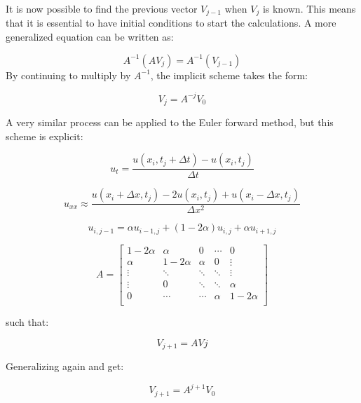 \documentclass[10pt,a4paper]{article}
\begin{document}
\noindent It is now possible to find the previous vector $V_{j-1}$ when $V_j$ is known. This means that it is essential to have initial conditions to start the calculations. A more generalized equation can be written as:

\begin{equation}
A^{-1}(AV_j) = A^{-1}(V_{j-1})
\end{equation}
\noindent By continuing to multiply by $A^{-1}$, the implicit scheme takes the form:

\begin{equation}
V_j = A^{-j}V_0
\end{equation}

\noindent A very similar process can be applied to the Euler forward method, but this scheme is explicit:

\begin{equation}
u_t = \frac{u(x_i,t_j + \Delta t) - u(x_i,t_j)}{\Delta t}
\end{equation}

\begin{equation}
u_{xx} \approx \frac{u(x_i + \Delta x,t_j) - 2u(x_i,t_j) + u(x_i - \Delta x,t_j)}{\Delta x^2} 
\end{equation}

\begin{equation}
u_{i,j-1} = \alpha u_{i-1,j} + (1 - 2\alpha)u_{i,j} + \alpha u_{i+1,j}
\end{equation}

\begin{equation}
A = \begin{bmatrix}
1 - 2\alpha & \alpha & 0 & \cdots & 0\\
\alpha & 1 - 2\alpha & \alpha & 0 & \vdots\\
\vdots & \ddots & \ddots & \ddots & \vdots\\
\vdots & 0 & \ddots & \ddots & \alpha\\
0 & \cdots & \cdots & \alpha & 1 - 2\alpha\\

\end{bmatrix}
\end{equation}

\noindent such that:

\begin{equation}
V_{j+1} = AVj
\end{equation}

\noindent Generalizing again and get:

\begin{equation}
V_{j+1}= A^{j+1}V_{0}
\end{equation}
\end{document}
